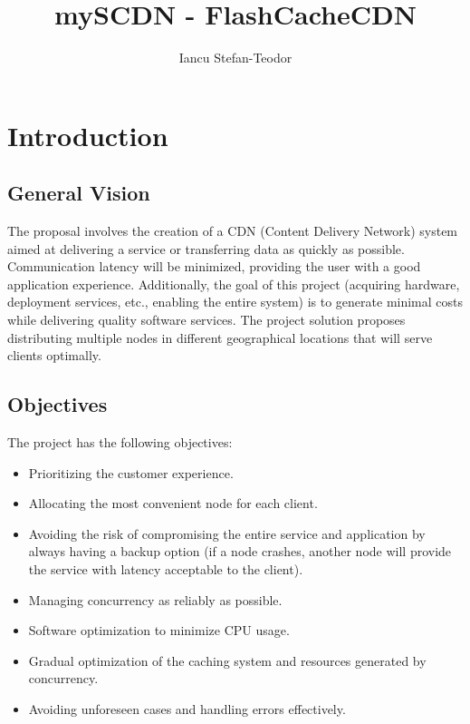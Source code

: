 \documentclass[runningheads]{llncs}
\begin{document}
\title{mySCDN - FlashCacheCDN}
\author{Iancu Stefan-Teodor}
\maketitle

\section{Introduction}
\subsection{General Vision}
The proposal involves the creation of a CDN (Content Delivery Network) system aimed at delivering a service or transferring data as quickly as possible. Communication latency will be minimized, providing the user with a good application experience. Additionally, the goal of this project (acquiring hardware, deployment services, etc., enabling the entire system) is to generate minimal costs while delivering quality software services. The project solution proposes distributing multiple nodes in different geographical locations that will serve clients optimally.

\subsection{Objectives}
The project has the following objectives:
\begin{itemize}
    \item Prioritizing the customer experience.
    \item Allocating the most convenient node for each client.
    \item Avoiding the risk of compromising the entire service and application by always having a backup option (if a node crashes, another node will provide the service with latency acceptable to the client).
    \item Managing concurrency as reliably as possible.
    \item Software optimization to minimize CPU usage.
    \item Gradual optimization of the caching system and resources generated by concurrency.
    \item Avoiding unforeseen cases and handling errors effectively.
\end{itemize}
\end{document}
